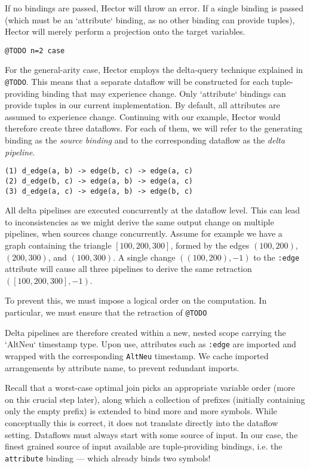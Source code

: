 \documentclass[../index.tex]{subfiles}
\begin{document}
If no bindings are passed, Hector will throw an error. If a single
binding is passed (which must be an `attribute` binding, as no other
binding can provide tuples), Hector will merely perform a projection
onto the target variables.

\texttt{@TODO n=2 case}

For the general-arity case, Hector employs the delta-query technique
explained in \texttt{@TODO}. This means that a separate dataflow will
be constructed for each tuple-providing binding that may experience
change. Only `attribute` bindings can provide tuples in our current
implementation. By default, all attributes are assumed to experience
change. Continuing with our example, Hector would therefore create
three dataflows. For each of them, we will refer to the generating
binding as the \emph{source binding} and to the corresponding dataflow
as the \emph{delta pipeline}.

\begin{verbatim}
(1) d_edge(a, b) -> edge(b, c) -> edge(a, c)
(2) d_edge(b, c) -> edge(a, b) -> edge(a, c)
(3) d_edge(a, c) -> edge(a, b) -> edge(b, c)
\end{verbatim}

All delta pipelines are executed concurrently at the dataflow
level. This can lead to inconsistencies as we might derive the same
output change on multiple pipelines, when sources change
concurrently. Assume for example we have a graph containing the
triangle $[100,200,300]$, formed by the edges $(100,200)$,
$(200,300)$, and $(100,300)$. A single change $((100,200),-1)$ to the
\texttt{:edge} attribute will cause all three pipelines to derive the
same retraction $([100,200,300],-1)$.

To prevent this, we must impose a logical order on the computation. In
particular, we must ensure that the retraction of \texttt{@TODO}

Delta pipelines are therefore created within a new, nested scope
carrying the `AltNeu` timestamp type. Upon use, attributes such as
\texttt{:edge} are imported and wrapped with the corresponding
\texttt{AltNeu} timestamp. We cache imported arrangements by attribute
name, to prevent redundant imports.

Recall that a worst-case optimal join picks an appropriate variable
order (more on this crucial step later), along which a collection of
prefixes (initially containing only the empty prefix) is extended to
bind more and more symbols. While conceptually this is correct, it
does not translate directly into the dataflow setting. Dataflows must
always start with some source of input. In our case, the finest
grained source of input available are tuple-providing bindings,
i.e. the \texttt{attribute} binding — which already binds two symbols!
\end{document}
